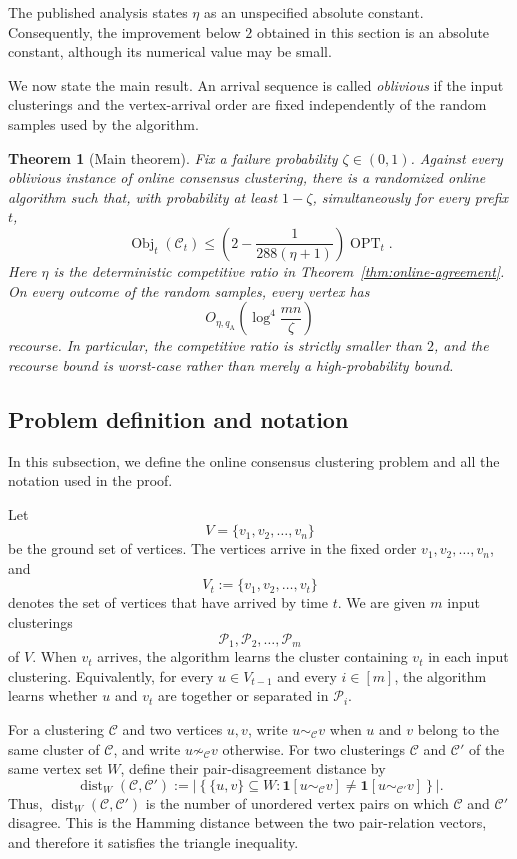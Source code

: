 \documentclass[11pt]{article}
\newtheorem{theorem}{Theorem}
\theoremstyle{definition}
\theoremstyle{remark}
\newcommand{\C}{\mathcal C}
\newcommand{\Pp}{\mathcal P}
\newcommand{\OPT}{\operatorname{OPT}}
\newcommand{\Obj}{\operatorname{Obj}}
\newcommand{\dist}{\operatorname{dist}}
\newcommand{\1}{\mathbf 1}
\begin{document}
The published analysis states $\eta$ as an unspecified absolute constant.
Consequently, the improvement below $2$ obtained in this section is an
absolute constant, although its numerical value may be small.

We now state the main result.  An arrival sequence is called
\emph{oblivious} if the input clusterings and the vertex-arrival order are
fixed independently of the random samples used by the algorithm.

\begin{theorem}[Main theorem]\label{thm:main}
Fix a failure probability $\zeta\in(0,1)$.  Against every oblivious instance
of online consensus clustering, there is a randomized online algorithm such
that, with probability at least $1-\zeta$, simultaneously for every prefix
$t$,
\begin{equation}\label{eq:main-ratio}
  \Obj_t(\C_t)
  \le
  \left(2-\frac{1}{288(\eta+1)}\right)\OPT_t.
\end{equation}
Here $\eta$ is the deterministic competitive ratio in
Theorem~\ref{thm:online-agreement}.  On every outcome of the random samples,
every vertex has
\[
  O_{\eta,q_{\mathrm A}}\!\left(
     \log^4\!\frac{mn}{\zeta}
  \right)
\]
recourse.  In particular, the competitive ratio is strictly smaller than
$2$, and the recourse bound is worst-case rather than merely a
high-probability bound.
\end{theorem}

\subsection{Problem definition and notation}

In this subsection, we define the online consensus clustering problem and
all the notation used in the proof.

Let
\[
  V=\{v_1,v_2,\ldots,v_n\}
\]
be the ground set of vertices.  The vertices arrive in the fixed order
$v_1,v_2,\ldots,v_n$, and
\[
  V_t:=\{v_1,v_2,\ldots,v_t\}
\]
denotes the set of vertices that have arrived by time $t$.  We are given
$m$ input clusterings
\[
  \Pp_1,\Pp_2,\ldots,\Pp_m
\]
of $V$.  When $v_t$ arrives, the algorithm learns the cluster containing
$v_t$ in each input clustering.  Equivalently, for every $u\in V_{t-1}$ and
every $i\in[m]$, the algorithm learns whether $u$ and $v_t$ are together or
separated in $\Pp_i$.

For a clustering $\C$ and two vertices $u,v$, write
$u\sim_{\C}v$ when $u$ and $v$ belong to the same cluster of $\C$, and write
$u\not\sim_{\C}v$ otherwise.  For two clusterings $\C$ and $\C'$ of the same
vertex set $W$, define their pair-disagreement distance by
\begin{equation}\label{eq:partition-distance}
 \dist_W(\C,\C')
 :=
 \left|
 \left\{
   \{u,v\}\subseteq W:
   \1[u\sim_{\C}v]\ne\1[u\sim_{\C'}v]
 \right\}
 \right|.
\end{equation}
Thus, $\dist_W(\C,\C')$ is the number of unordered vertex pairs on
which $\C$ and $\C'$ disagree.  This is the Hamming distance between the
two pair-relation vectors, and therefore it satisfies the triangle
inequality.
\end{document}
